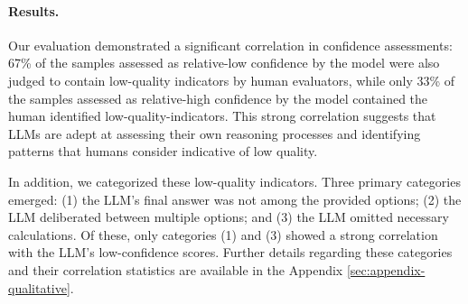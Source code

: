 \paragraph{Results.} Our evaluation demonstrated a significant correlation in confidence assessments: 67\% of the samples assessed as relative-low confidence by the model were also judged to contain low-quality indicators by human evaluators, while only 33\% of the samples assessed as relative-high confidence by the model contained the human identified low-quality-indicators. This strong correlation suggests that LLMs are adept at assessing their own reasoning processes and identifying patterns that humans consider indicative of low quality. 

In addition, we categorized these low-quality indicators. Three primary categories emerged: (1) the LLM's final answer was not among the provided options; (2) the LLM deliberated between multiple options; and (3) the LLM omitted necessary calculations. Of these, only categories (1) and (3) showed a strong correlation with the LLM's low-confidence scores. Further details regarding these categories and their correlation statistics are available in the Appendix \ref{sec:appendix-qualitative}.